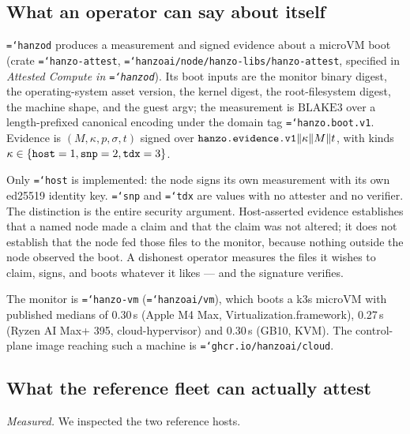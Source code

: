 \documentclass[11pt,a4paper]{article}
\newcommand{\code}[1]{\texttt{\hyphenchar\font=`\-\relax #1}}
\begin{document}
\subsection{What an operator can say about itself}
\label{sec:evidence}

\code{hanzod} produces a measurement and signed evidence about a microVM boot
(crate \code{hanzo-attest}, \code{hanzoai/node/hanzo-libs/hanzo-attest},
specified in \emph{Attested Compute in \code{hanzod}}). Its boot inputs are the
monitor binary digest, the operating-system asset version, the kernel digest,
the root-filesystem digest, the machine shape, and the guest argv; the
measurement is $\mathrm{BLAKE3}$ over a length-prefixed canonical encoding under
the domain tag \code{hanzo.boot.v1}. Evidence is $(M, \kappa, p, \sigma, t)$
signed over $\code{hanzo.evidence.v1} \| \kappa \| M \| t$, with kinds
$\kappa \in \{\code{host}=1, \code{snp}=2, \code{tdx}=3\}$.

Only \code{host} is implemented: the node signs its own measurement with its own
ed25519 identity key. \code{snp} and \code{tdx} are values with no attester and
no verifier. The distinction is the entire security argument. Host-asserted
evidence establishes that a named node made a claim and that the claim was not
altered; it does not establish that the node fed those files to the monitor,
because nothing outside the node observed the boot. A dishonest operator
measures the files it wishes to claim, signs, and boots whatever it likes --- and
the signature verifies.

The monitor is \code{hanzo-vm} (\code{hanzoai/vm}), which boots a k3s microVM
with published medians of 0.30\,s (Apple M4 Max, Virtualization.framework),
0.27\,s (Ryzen AI Max+ 395, cloud-hypervisor) and 0.30\,s (GB10, KVM). The
control-plane image reaching such a machine is \code{ghcr.io/hanzoai/cloud}.

\subsection{What the reference fleet can actually attest}
\label{sec:fleet}

\emph{Measured.} We inspected the two reference hosts.
\end{document}
